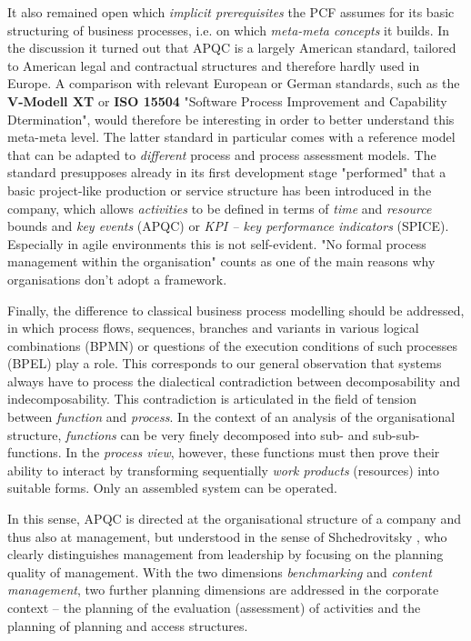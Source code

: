 \documentclass[11pt,a4paper]{article}
\begin{document}
It also remained open which \emph{implicit prerequisites} the PCF assumes for
its basic structuring of business processes, i.e. on which \emph{meta-meta
  concepts} it builds. In the discussion it turned out that APQC is a largely
American standard, tailored to American legal and contractual structures and
therefore hardly used in Europe. A comparison with relevant European or German
standards, such as the \textbf{V-Modell XT} or \textbf{ISO 15504} "Software
Process Improvement and Capability Dtermination", would therefore be
interesting in order to better understand this meta-meta level. The latter
standard in particular comes with a reference model that can be adapted to
\emph{different} process and process assessment models. The standard
presupposes already in its first development stage "performed" that a basic
project-like production or service structure has been introduced in the
company, which allows \emph{activities} to be defined in terms of \emph{time}
and \emph{resource} bounds and \emph{key events} (APQC) or \emph{KPI -- key
  performance indicators} (SPICE). Especially in agile environments this is
not self-evident. "No formal process management within the organisation"
counts as one of the main reasons why organisations don’t adopt a framework.

Finally, the difference to classical business process modelling should be
addressed, in which process flows, sequences, branches and variants in various
logical combinations (BPMN) or questions of the execution conditions of such
processes (BPEL) play a role. This corresponds to our general observation that
systems always have to process the dialectical contradiction between
decomposability and indecomposability. This contradiction is articulated in
the field of tension between \emph{function} and \emph{process}. In the
context of an analysis of the organisational structure, \emph{functions} can
be very finely decomposed into sub- and sub-sub-functions. In the
\emph{process view}, however, these functions must then prove their ability to
interact by transforming sequentially \emph{work products} (resources) into
suitable forms. Only an assembled system can be operated.

In this sense, APQC is directed at the organisational structure of a company
and thus also at management, but understood in the sense of Shchedrovitsky
\cite{MSM}, who clearly distinguishes management from leadership by focusing
on the planning quality of management. With the two dimensions
\emph{benchmarking} and \emph{content management}, two further planning
dimensions are addressed in the corporate context -- the planning of the
evaluation (assessment) of activities and the planning of planning and access
structures.
\end{document}
